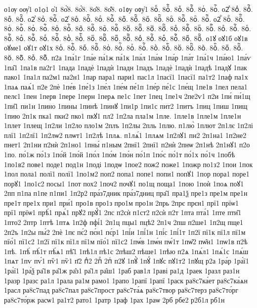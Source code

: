 {о1ѹ
оѹ҆1
о1ѻ1
о҆1
8о҆̀8.
8о҆́8.
8о҆̈8.
8о҆̑8.
о1ᲂу
оᲂу҆1
8оⷠ.
8оⷠ҇.
8оⷡ.
8оⷡ҇.
8оⷢ.
8оⷢ҇.
о2ⷣ
8оⷣ.
8оⷣ҇.
8оⷤ.
8оⷤ҇.
о2ⷥ
8оⷥ.
8оⷥ҇.
о2ⷦ
8оⷦ.
8оⷦ҇.
8оⷧ.
8оⷧ҇.
8оⷨ.
8оⷨ҇.
8оⷩ.
8оⷩ҇.
8оⷪ.
8оⷪ҇.
8оⷫ.
8оⷫ҇.
о2ⷬ
8оⷬ.
8оⷬ҇.
8оⷭ.
8оⷭ҇.
8оⷮ.
8оⷮ҇.
8оⷯ.
8оⷯ҇.
8оⷰ.
8оⷰ҇.
8оⷱ.
8оⷱ҇.
8оⷲ.
8оⷲ҇.
8оⷳ.
8оⷳ҇.
8оⷴ.
8оⷴ҇.
8оⷵ.
8оⷵ҇.
8оⷶ.
8оⷶ҇.
8оⷷ.
8оⷷ҇.
8оⷸ.
8оⷸ҇.
8оⷹ.
8оⷹ҇.
8оⷺ.
8оⷺ҇.
8оⷻ.
8оⷻ҇.
8оⷼ.
8оⷼ҇.
8оⷽ.
8оⷽ҇.
8оⷾ.
8оⷾ҇.
8оⷿ.
8оⷿ҇.
о1ꙋ
оꙋ1б
оꙋ1в
оꙋме1
оꙋ1т
оꙋ1х
8оꙴ.
8оꙴ҇.
8оꙵ.
8оꙵ҇.
8оꙶ.
8оꙶ҇.
8оꙷ.
8оꙷ҇.
8оꙸ.
8оꙸ҇.
8оꙹ.
8оꙹ҇.
8оꙺ.
8оꙺ҇.
8оꙻ.
8оꙻ҇.
8о꙼.
8о꙼҇.
8о꙽.
8о꙽҇.
п2а
1па́1г
1па́е
па́1ж
па́1к
1па́л
1па́м
1па́р
1па́т
1па́1ч
1па́ю1
1па́ѵ
1па̑1
1па1в
па2г1
1пада
1падѐ
1падѝ
1падн
1падъ
1падѐ
1падѝ
1падѣ
1падꙋ
1пак
пако1
1па1л
па2м1
па2н1
1пар
пара1
пари1
пас1л
1пасї1
1пасї1
па1т2
1паф
па1х
1паѧ
паѧ́1
п2е
2пѐ
1пе́в
1пе́1з
1пе́л
1пе́м
пе́1п
1пе́р
пе́1с
1пе́щ
1пе1в
1пел
пела1
пелє1
1пен
1перв
1пере
1перн
1перѧ
пе1с
1пет
1пец
1пе1ч
2пе2ѵ1
п2и
1пи́
пи́1щ
1пи̑1
пи1н
1пино
1пины
1пинѣ
1пинꙋ
1пи1р
1пи1с
пит2
1питъ
1пиц
1пиш
1пищ
1пию
2п1к
пка1
пки2
пко1
пкꙋ1
пл2
1п2ла
пла1м
1пле.
1пле1в
1пле1м
1пле1н
1плет
1плещ
1п2ли
1п2ло
пло1м
2плъ
1п2лы
2пль
1плю.
п1лю̀
1плют
2п1лє
1п2лі
плї1
1п2лї1
1п2лѡ2
плѡт1
1п2лѣ
1плѧ.
п1лѧ́1
1плѧм
1п2лꙋ1
пн2
2п1на1
1п2не2
пнет1
2п1ни
п2нѝ
2п1но1
1пны́
п1ным
2пнї1
2пнї1
п2нѝ
2пнѡ
2п1нѣ
2п1нꙋ1
п2о
1по.
по́1ж
по́1з
1по́й
1по́й
1по́л
1по́м
1по́н
по́1п
1по́с
по́1т
по́1х
по́1ч
1побѣ
1по1в2
пове1
поде1
под1н
1поді
1подѡ
1пое2
пож2
поже1
1пожр
по1з2
1пои
1пок
1пол
пола1
полї1
полї1
1по1м2
поп2
попа1
попе1
попи1
попꙋ1
1пор
пора1
поре1
порꙋ1
1по1с2
посы1
1пот
пох2
1поч2
почꙋ1
по1щ
поща1
1пою
1поѝ
1поѧ
поꙋ1
2пп
п1па
п1пе
п1пи1
1п2р2
пра́з7дник
пра́з7дниц
пра̑1
пра1ѯ
пре1з
пре1м
пре1н
пре1т
пре1х
при1
при́1
про1в
про1з
про1м
про1н
2прь
2прє
прєн1
прї1
прїѡ1
прї1
прїѡ1
прѣ́1
прѧ́1
прꙋ2
прꙋ́1
2пс
п2сѝ
п1ст2
п2сѝ
п2т
1пта
пта́1
1пте
пти̑1
1пто2
2птр
1птѣ
1птѧ
1п2ф
пфі́1
2п1ц
пцы1
пцѣ2
2п1ч
2пш
п2ше1
1п2щ
пще1
2п2ъ
1п2ы
пы́2
2пѐ
1пє
пє́2
пє́н1
пє́р1
1пі́и
1пі́1н
1пі́с
1пі́1т
1п2ї
пї1к
пї1л
пї1м
пїо́1
пї1с2
1п2ї
пї1к
пї1л
пї1м
пїо́1
пї1с2
1пѡ́в
1пѡ́н
пѡ́1т
1пѡ̑2
пѡ̑н1
1пѡ1в
п2ѣ
1пѣ.
1пѣ́
пѣ́1т
пѣ́ѧ1
пѣ̑1
1пѣ1л
пѣ1с
2пѣш2
пѣше1
1пѣю
п2ѧ
1пѧ́л1
1пѧ́1с
1пѧ́ш
1пѧт
1пѵ
пѵ́1
пѷ1
пѷ1
п҃2
пⷣ2
2пⷬ
2пⷭ
п2ꙋ
1пꙋ̀
1пꙋ́
1пꙋс
пꙋ1т2
1пꙋщ
р2а
1ра́р
1ра́ї1
1ра́ї1
1ра́ѯ
ра̑1в
ра̑1ж
ра̑з1
ра̑1л
ра̑ш1
1раб
рав1л
1раві
ра1д
1раек
1разл
раз1н
1разр
1разс
ра1л
1рала
ра1м
рамо1
1рапо
1рапї
1рапї
1раск
ра8с7ка́ет
ра8с7ка́ѧн
1расл
ра8с7пад
ра8с7пал
ра8с7прост
ра8с7та́ѧ
ра8с7твор
ра8с7терз
ра8с7то́рг
ра8с7то́рж
расѡ1
ра1т2
рато1
1ратр
1раф
1рах
1раѡ
2рб
рбе2
р2б1л
рб1н
}
